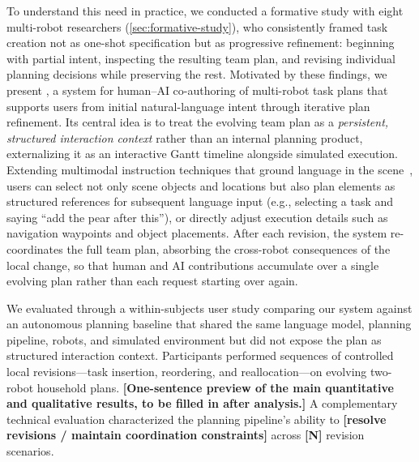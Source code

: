 To understand this need in practice, we conducted a formative study with eight multi-robot researchers (\autoref{sec:formative-study}), who consistently framed task creation not as one-shot specification but as progressive refinement: beginning with partial intent, inspecting the resulting team plan, and revising individual planning decisions while preserving the rest.
Motivated by these findings, we present \oursystem{}, a system for human--AI co-authoring of multi-robot task plans that supports users from initial natural-language intent through iterative plan refinement.
Its central idea is to treat the evolving team plan as a \emph{persistent, structured interaction context} rather than an internal planning product, externalizing it as an interactive Gantt timeline alongside simulated execution.
Extending multimodal instruction techniques that ground language in the scene~\cite{mahadevan2025imageinthat, masson2024directgpt}, %
users can select not only scene objects and locations but also plan elements as structured references for subsequent language input (e.g., selecting a task and saying ``add the pear after this''), or directly adjust execution details such as navigation waypoints and object placements.
After each revision, the system re-coordinates the full team plan, absorbing the cross-robot consequences of the local change, so that human and AI contributions accumulate over a single evolving plan rather than each request starting over again.

We evaluated \oursystem{} through a within-subjects user study comparing our system against an autonomous planning baseline that shared the same language model, planning pipeline, robots, and simulated environment but did not expose the plan as structured interaction context.
Participants performed sequences of controlled local revisions---task insertion, reordering, and reallocation---on evolving two-robot household plans.
\textbf{[One-sentence preview of the main quantitative and qualitative results, to be filled in after analysis.]}
A complementary technical evaluation characterized the planning pipeline's ability to \textbf{[resolve revisions / maintain coordination constraints]} across \textbf{[N]} revision scenarios.

